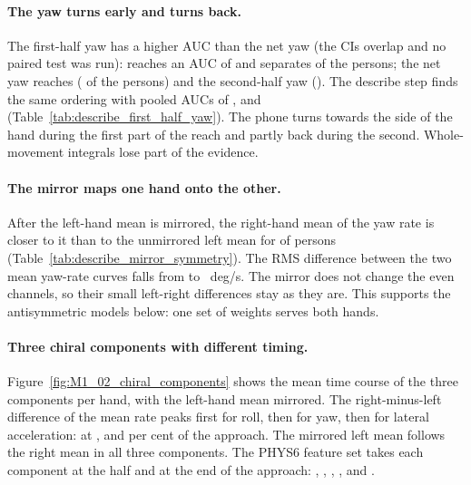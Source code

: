 
\paragraph{The yaw turns early and turns back.} The first-half yaw has a higher AUC than
the net yaw (the CIs overlap and no paired test was run):  reaches an AUC of  and separates
 of the persons; the net yaw reaches 
( of the persons) and the second-half yaw 
(). The describe step finds the same ordering with pooled AUCs of
,  and
 (Table~\ref{tab:describe_first_half_yaw}). The phone turns
towards the side of the hand during the first part of the reach and partly back during the second.
Whole-movement integrals lose part of the evidence.


\paragraph{The mirror maps one hand onto the other.} After the left-hand mean is mirrored, the
right-hand mean of the yaw rate is closer to it than to the unmirrored left mean for
 of  persons
(Table~\ref{tab:describe_mirror_symmetry}). The RMS difference between the two mean yaw-rate curves
falls from  to ~deg/s. The mirror
does not change the even channels, so their small left-right differences stay as they are. This
supports the antisymmetric models below: one set of weights serves both hands.


\paragraph{Three chiral components with different timing.} Figure~\ref{fig:M1_02_chiral_components}
shows the mean time course of the three components per hand, with the left-hand mean mirrored. The
right-minus-left difference of the mean rate peaks first for roll, then for yaw, then for lateral
acceleration: at ,  and 
per cent of the approach. The mirrored left mean follows the right mean in all three components. The PHYS6 feature set takes each component at the half and at the end of the approach:
, , , ,  and
.

